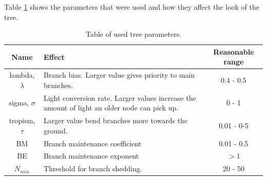\documentclass{article}
\begin{document}
  		Table \ref{table:param} shows the parameters that were used and how they affect the look of the tree.
  		
  		\begin{table} [!h]
  			\begin{center}
  				\begin{tabular}{ | c | m{5cm} | c | } 
  					\hline
  					Name & Effect & Reasonable range \\
  					\hline
  					\hline
  					lambda, $\lambda$ & Branch bias. Larger value gives priority to main branches. & 0.4 - 0.5 \\ 
  					\hline
  					sigma, $\sigma$ & Light conversion rate. Larger values increase the amount of light an older node can pick up. & 0 - 1\\ 
  					\hline
  					tropism, $\tau$ & Larger value bend branches more towards the ground. & 0.01 - 0-5 \\ 
  					\hline
  					BM & Branch maintenance coefficient & 0.01 - 0.5 \\ 
  					\hline
  					BE & Branch maintenance exponent &  $>$1\\ 
  					\hline
  					$N_{min}$ & Threshold for branch shedding. & 20 - 50 \\ 
  					\hline
  				\end{tabular}
  				\caption{Table of used tree parameters.}
  				\label{table:param}
  			\end{center}
  		\end{table}
  		
\end{document}
